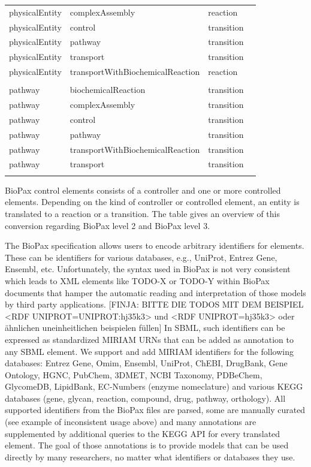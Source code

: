 \documentclass{bioinfo}
\begin{document}
\begin{methods}
\begin{table}[!t]
{\begin{tabular}{llll}
physicalEntity & complexAssembly                    & reaction\\
physicalEntity & control                            & transition\\
physicalEntity & pathway                            & transition\\
physicalEntity & transport                          & transition\\
physicalEntity & transportWithBiochemicalReaction   & reaction\\
\\
pathway         & biochemicalReaction               & transition\\
pathway         & complexAssembly                   & transition\\
pathway         & control                           & transition\\
pathway         & pathway                           & transition\\
pathway         & transportWithBiochemicalReaction  & transition\\
pathway         & transport                         & transition\\\botrule
\end{tabular}}{BioPax control elements consists of a controller and one or more controlled elements. Depending on the kind of controller or controlled element, an entity is translated to a reaction or a transition. The table gives an overview of this conversion regarding BioPax level 2 and BioPax level 3.}
\end{table}



The BioPax specification allows users to encode arbitrary identifiers for elements. These can be identifiers for various databases, e.g., UniProt, Entrez Gene, Ensembl, etc. Unfortunately, the syntax used in BioPax is not very consistent which leads to XML elements like TODO-X or TODO-Y within BioPax documents that hamper the automatic reading and interpretation of those models by third party applications. [FINJA: BITTE DIE TODOS MIT DEM BEISPIEL <RDF UNIPROT=UNIPROT:hj35k3> und <RDF UNIPROT=hj35k3> oder \"ahnlichen uneinheitlichen beispielen f\"ullen]
In SBML, such identifiers can be expressed as standardized MIRIAM URNs that can be added as annotation to any SBML element. We support and add MIRIAM identifiers for the following databases: Entrez Gene, Omim, Ensembl, UniProt, ChEBI, DrugBank, Gene Ontology, HGNC, PubChem, 3DMET, NCBI Taxonomy, PDBeChem, GlycomeDB, LipidBank, EC-Numbers (enzyme nomeclature) and various KEGG databases (gene, glycan, reaction, compound, drug, pathway, orthology).
All supported identifiers from the BioPax files are parsed, some are manually curated (see example of inconsistent usage above) and many annotations are supplemented by additional queries to the KEGG API for every translated element. The goal of those annotations is to provide models that can be used directly by many researchers, no matter what identifiers or databases they use.


\end{methods}
\end{document}

